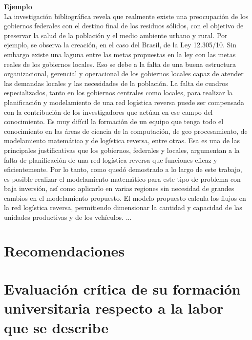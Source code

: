 {\bf Ejemplo}\\
La investigación bibliográfica revela que realmente existe una preocupación de los gobiernos federales con el destino final de los residuos sólidos, con el objetivo de preservar la salud de la población y el medio ambiente urbano y rural. Por ejemplo, se observa la creación, en el caso del Brasil, de la Ley 12.305/10. Sin embargo existe una laguna entre las metas propuestas en la ley con las metas reales de los gobiernos locales. Eso se debe a la falta de una buena estructura organizacional, gerencial y operacional de los gobiernos locales capaz de atender las demandas locales y las necesidades de la población.
\vskip 0.3cm
La falta de cuadros especializados, tanto en los gobiernos centrales como locales, para realizar la planificación y modelamiento de una red logística reversa puede ser compensada con la contribución de los investigadores que actúan en ese campo del conocimiento. Es muy difícil la formación de un equipo que tenga todo el conocimiento en las áreas de ciencia de la computación, de geo procesamiento, de modelamiento matemático y de logística reversa, entre otras. Esa es una de las principales justificativas que los gobiernos, federales y locales, argumentan a la falta de planificación de una red logística reversa que funciones eficaz y eficientemente. 
\vskip 0.3cm
Por lo tanto, como quedó demostrado a lo largo de este trabajo, es posible realizar el modelamiento matemático para este tipo de problema con baja inversión, así como aplicarlo en varias regiones sin necesidad de grandes cambios en el modelamiento propuesto. El modelo propuesto calcula los flujos en la red logística reversa, permitiendo dimensionar la cantidad y capacidad de las unidades productivas y de los vehículos. 
\vskip 0.3cm
...


\section{Recomendaciones}


\section{Evaluación crítica de su formación universitaria respecto a la labor que se describe}
